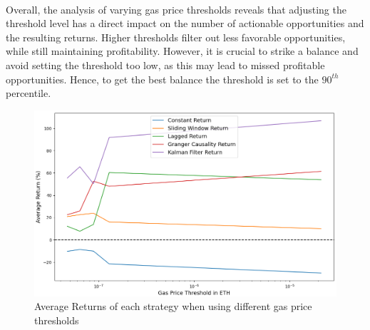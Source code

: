 \\[3mm]
Overall, the analysis of varying gas price thresholds reveals that adjusting the threshold level has a direct impact on the number of actionable opportunities and the resulting returns. Higher thresholds filter out less favorable opportunities, while still maintaining profitability. However, it is crucial to strike a balance and avoid setting the threshold too low, as this may lead to missed profitable opportunities. Hence, to get the best balance the threshold is set to the $90^{th}$ percentile.

\begin{figure}[H]
    \centering
    \includegraphics[width=\linewidth]{evaluation/Images/VaryGPThreshold.png}
    \caption{Average Returns of each strategy when using different gas price thresholds}
    \label{fig:VaryGasPriceThresholds}
\end{figure}


